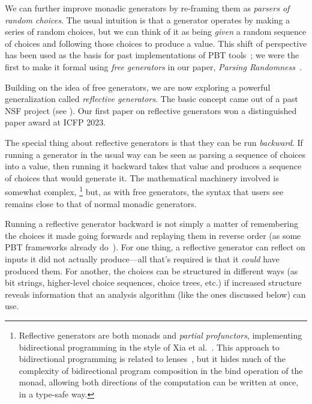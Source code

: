 We can further improve monadic generators by re-framing them as {\em
  parsers of random choices}. The usual intuition is that a generator
operates by making a series of random choices, but we can think of
it as being {\em given} a random sequence of choices and following
those choices to produce a value. This shift of perspective has been
used as the basis for past implementations of PBT
tools~\cite{maciver2019hypothesis, dolan2017testing}; we were the
first to make it
formal using {\em free generators}
in our paper, {\em Parsing Randomness}~\cite{goldstein2022parsing}.


 Building on the
idea of free generators, we are now exploring a powerful
generalization called {\em reflective
  generators}.  The basic concept came out of a
past NSF project (see ). Our first paper on
reflective generators won a distinguished paper award at ICFP 2023.

The special thing about reflective generators is that they can be run
{\em backward}.
If running a generator in the usual way can be seen as parsing a
sequence of choices into a
value, then running it backward takes that value and produces a
sequence of choices that
would generate it.
The mathematical machinery
involved is somewhat complex,%
\footnote{\normalsize Reflective generators are both monads and {\em
    partial profunctors},
implementing bidirectional programming in the style of Xia et
al.~\cite{xia2019composing}. This approach to bidirectional programming is
related to lenses~\cite{foster2009bidirectional}, but it hides much of the
complexity of bidirectional program composition in the bind operation of the
monad, allowing both directions of
the computation can be written at once, in a type-safe way.}
but, as with free generators, the syntax that users see remains close to
that of normal monadic generators.

Running a reflective generator backward is not simply a matter of
remembering the choices it made going forwards and replaying them in
reverse order (as some PBT frameworks already do~\cite{maciver2019hypothesis,
  hatfield-dodds_hypofuzz_nodate}). For one thing, a reflective
generator can reflect on inputs it did not actually
produce---all that's required is that it {\em could} have produced
them.  For another, the choices can be structured in different ways (as bit
strings, higher-level choice sequences, choice trees, etc.) if increased
structure reveals information that an analysis algorithm (like the ones
discussed below) can use. \iflater{}\fi{}


